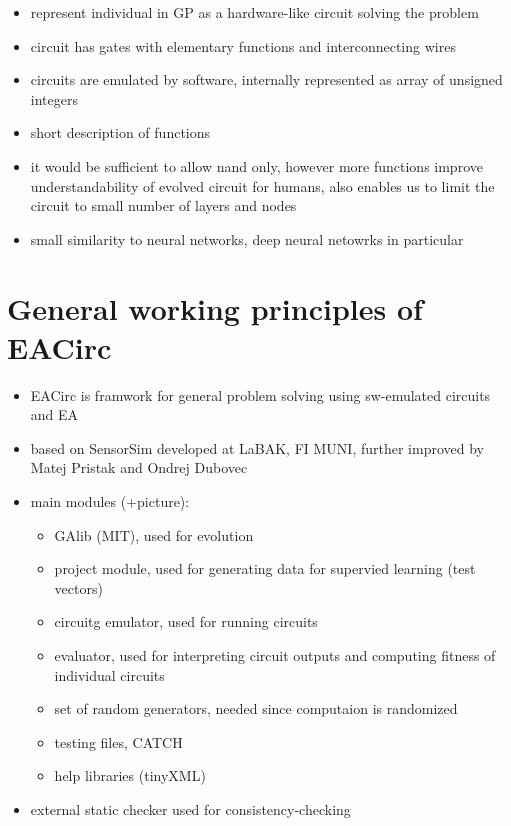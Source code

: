 \documentclass[12pt,oneside]{fithesis2}
\begin{document}
\begin{itemize}
\item represent individual in GP as a hardware-like circuit solving the problem
\item circuit has gates with elementary functions and interconnecting wires
\item circuits are emulated by software, internally represented as array of unsigned integers
\item short description of functions
\item it would be sufficient to allow nand only, however more functions improve understandability of evolved circuit for humans, also enables us to limit the circuit to small number of layers and nodes
\item small similarity to neural networks, deep neural netowrks in particular
\end{itemize}

\section{General working principles of EACirc}
\label{sec:eacirc-principles}

\begin{itemize}
\item EACirc is framwork for general problem solving using sw-emulated circuits and EA
\item based on SensorSim developed at LaBAK, FI MUNI, further improved by Matej Pristak and Ondrej Dubovec
\item main modules (+picture):
\begin{itemize}
\item GAlib (MIT), used for evolution
\item project module, used for generating data for supervied learning (test vectors)
\item circuitg emulator, used for running circuits
\item evaluator, used for interpreting circuit outputs and computing fitness of individual circuits
\item set of random generators, needed since computaion is randomized
\item testing files, CATCH
\item help libraries (tinyXML)
\end{itemize}
\item external static checker used for consistency-checking
\end{itemize}
\end{document}
